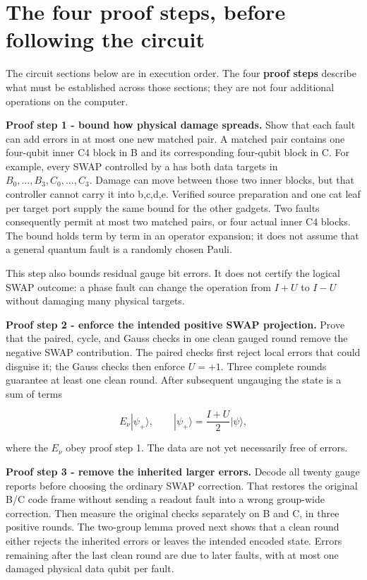 \documentclass[11pt]{article}
\begin{document}
\section{The four proof steps, before following the circuit}
The circuit sections below are in execution order. The four \textbf{proof steps} describe what must be established across those sections; they are not four additional operations on the computer.

\textbf{Proof step 1 - bound how physical damage spreads.} Show that each fault can add errors in at most one new matched pair. A matched pair contains one four-qubit inner C4 block in B and its corresponding four-qubit block in C. For example, every SWAP controlled by a has both data targets in \(B_0,\ldots,B_3,C_0,\ldots,C_3\). Damage can move between those two inner blocks, but that controller cannot carry it into b,c,d,e. Verified source preparation and one cat leaf per target port supply the same bound for the other gadgets. Two faults consequently permit at most two matched pairs, or four actual inner C4 blocks. The bound holds term by term in an operator expansion; it does not assume that a general quantum fault is a randomly chosen Pauli.

This step also bounds residual gauge bit errors. It does not certify the logical SWAP outcome: a phase fault can change the operation from \(I+U\) to \(I-U\) without damaging many physical targets.

\textbf{Proof step 2 - enforce the intended positive SWAP projection.} Prove that the paired, cycle, and Gauss checks in one clean gauged round remove the negative SWAP contribution. The paired checks first reject local errors that could disguise it; the Gauss checks then enforce \(U=+1\). Three complete rounds guarantee at least one clean round. After subsequent ungauging the state is a sum of terms

\[
E_\nu|\psi_+\rangle,\qquad
|\psi_+\rangle=\frac{I+U}{2}|\psi\rangle,
\]

where the \(E_\nu\) obey proof step 1. The data are not yet necessarily free of errors.

\textbf{Proof step 3 - remove the inherited larger errors.} Decode all twenty gauge reports before choosing the ordinary SWAP correction. That restores the original B/C code frame without sending a readout fault into a wrong group-wide correction. Then measure the original checks separately on B and C, in three positive rounds. The two-group lemma proved next shows that a clean round either rejects the inherited errors or leaves the intended encoded state. Errors remaining after the last clean round are due to later faults, with at most one damaged physical data qubit per fault.
\end{document}
